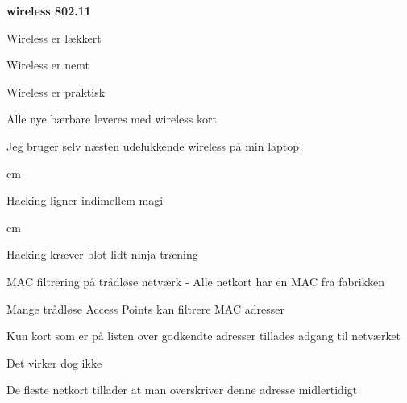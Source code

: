 \documentclass[20pt,landscape,a4paper,footrule]{foils}
\begin{document}

\centerline{\color{titlecolor}\LARGE\bf wireless 802.11}


\begin{list1}
\item Wireless er lækkert
\item Wireless er nemt
\item Wireless er praktisk
\item Alle nye bærbare leveres med wireless kort
\item Jeg bruger selv næsten udelukkende wireless på min laptop
\end{list1}



 cm

\centerline{Hacking ligner indimellem  magi}




 cm
\centerline{Hacking kræver blot lidt ninja-træning}




\begin{list1}
\item MAC filtrering på trådløse netværk - Alle netkort har en MAC fra fabrikken
\item Mange trådløse Access Points kan filtrere MAC adresser
\item Kun kort som er på listen over godkendte adresser tillades adgang til netværket
\pause
\item Det virker dog ikke \smiley
\item De fleste netkort tillader at man overskriver denne adresse midlertidigt
\end{list1}

\end{document}
